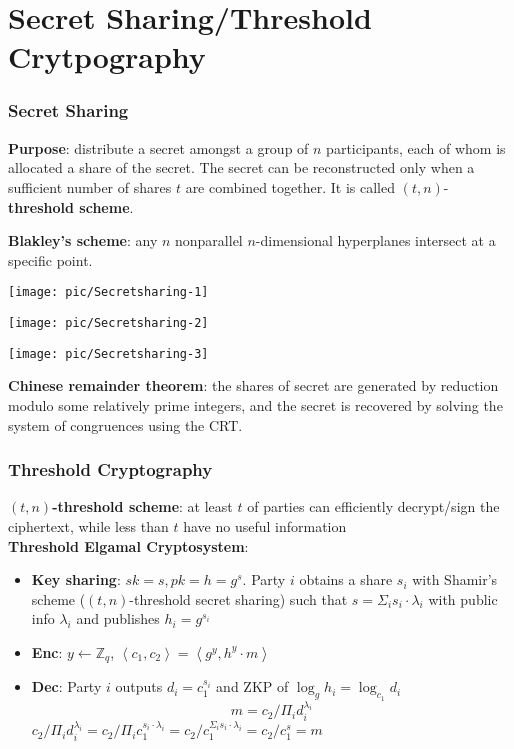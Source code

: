 \section{Secret Sharing/Threshold Crytpography}
\begin{frame}\frametitle{Secret Sharing}
\textbf{Purpose}: distribute a secret amongst a group of $n$ participants, each of whom is allocated a share of the secret. The secret can be reconstructed only when a sufficient number of shares $t$ are combined together. It is called $(t, n)$-\textbf{threshold scheme}.
\newline

\textbf{Blakley's scheme}: any $n$ nonparallel $n$-dimensional hyperplanes intersect at a specific point.

  \begin{minipage}[t]{0.32\linewidth} 
    \centering 
    \texttt{[image: pic/Secretsharing-1]} 
  \end{minipage}%
  \begin{minipage}[t]{0.32\linewidth} 
    \centering 
    \texttt{[image: pic/Secretsharing-2]} 
  \end{minipage}
  \begin{minipage}[t]{0.32\linewidth} 
    \centering 
    \texttt{[image: pic/Secretsharing-3]}  
  \end{minipage} 

\textbf{Chinese remainder theorem}: the shares of secret are generated by reduction modulo some relatively prime integers, and the secret is recovered by solving the system of congruences using the CRT.
\end{frame}
\begin{frame}\frametitle{Threshold Cryptography}
\textbf{$(t,n)$-threshold scheme}: at least $t$ of parties can efficiently decrypt/sign the ciphertext, while less than $t$ have no useful information\\

\textbf{Threshold Elgamal Cryptosystem}:
\begin{itemize}
\item \textbf{Key sharing}: $sk = s, pk=h=g^s$. Party $i$ obtains a share $s_i$ with Shamir's scheme  ($(t, n)$-threshold secret sharing) such that $s = \Sigma_i s_i\cdot \lambda_i$ with public info $\lambda_i$ and publishes $h_i = g^{s_i}$
\item \textbf{Enc}: $y \gets \mathbb{Z}_q$, $\left<c_1,c_2\right>=\left<g^y,h^y\cdot m\right>$
\item \textbf{Dec}: Party $i$ outputs $d_i = c_1^{s_i}$ and ZKP of $\log_gh_i = \log_{c_1} d_i$
\[ m = c_2/\Pi_i d_i^{\lambda_i} \]
$c_2/\Pi_i d_i^{\lambda_i} = c_2/\Pi_i c_1^{s_i\cdot \lambda_i} = c_2/c_1^{\Sigma_i s_i\cdot \lambda_i} = c_2/c_1^s=m$
\end{itemize}
\end{frame}
